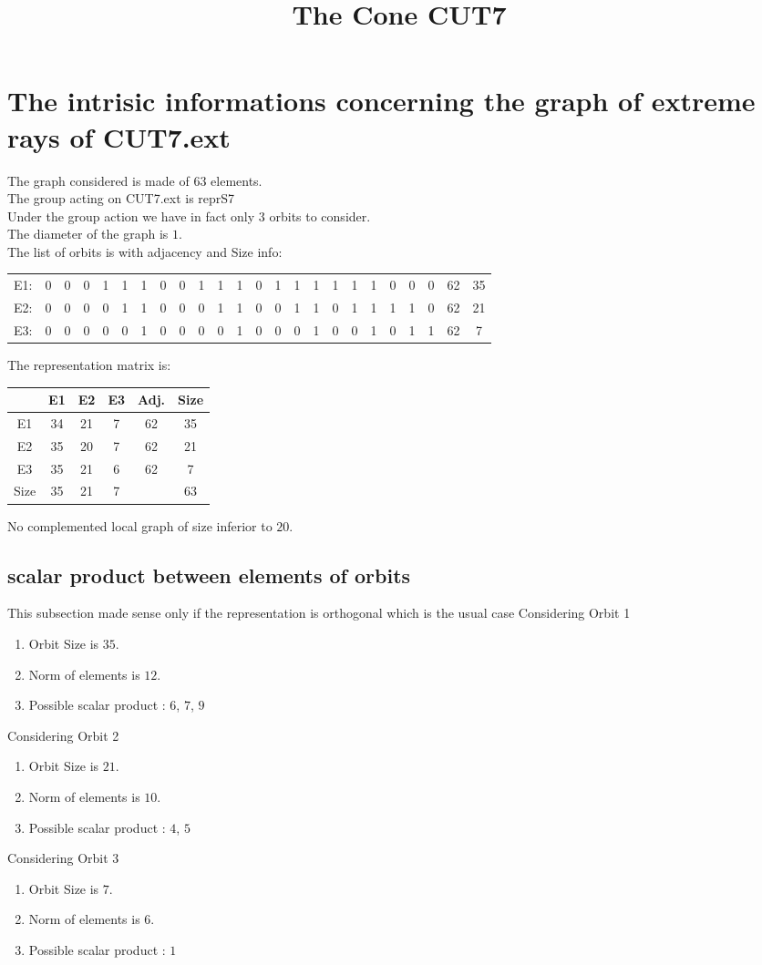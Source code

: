 \documentclass[12pt]{article}
\title{The Cone CUT7}
\begin{document}
\maketitle
\section{The intrisic informations concerning the graph of extreme rays of CUT7.ext}
The graph considered is made of $63$ elements.\\
The group acting on CUT7.ext is reprS7\\
Under the group action we have in fact only $3$ orbits to consider.\\
The diameter of the graph is $1$.\\
The list of orbits is with adjacency and Size info:
\begin{center}
\scriptsize
\begin{tabular}{cccccccccccccccccccccc|c|c}
E1:&0&0&0&1&1&1&0&0&1&1&1&0&1&1&1&1&1&1&0&0&0&62&35\\
E2:&0&0&0&0&1&1&0&0&0&1&1&0&0&1&1&0&1&1&1&1&0&62&21\\
E3:&0&0&0&0&0&1&0&0&0&0&1&0&0&0&1&0&0&1&0&1&1&62&7\\
\end{tabular}
\end{center}
The representation matrix is:
\begin{center}
\scriptsize
\begin{tabular}{|c|ccc|c|c|}
\hline
&E1&E2&E3&Adj.&Size\\
\hline
E1& 34& 21& 7&62&35\\
E2& 35& 20& 7&62&21\\
E3& 35& 21& 6&62&7\\
\hline
Size&35&21&7&&63\\
\hline
\end{tabular}
\end{center}
No complemented local graph of size inferior to $20$.
\subsection{scalar product between elements of orbits}
\noindent This subsection made sense only if the representation is orthogonal which is the usual case
Considering Orbit 1
\begin{enumerate}
\item Orbit Size is $35$.
\item Norm of elements is $12$.
\item Possible scalar product : $6$, $7$, $9$
\end{enumerate}
Considering Orbit 2
\begin{enumerate}
\item Orbit Size is $21$.
\item Norm of elements is $10$.
\item Possible scalar product : $4$, $5$
\end{enumerate}
Considering Orbit 3
\begin{enumerate}
\item Orbit Size is $7$.
\item Norm of elements is $6$.
\item Possible scalar product : $1$
\end{enumerate}
\end{document}
